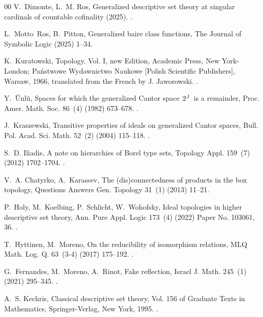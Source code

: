 \documentclass{amsart}
\numberwithin{equation}{section}
\newcommand{\1}{\mathbf{I}}
\newcommand{\2}{\mathbf{II}}
\theoremstyle{definition}
\theoremstyle{remark}
\begin{document}
\begin{thebibliography}{00}
V.~Dimonte, L.~M. Ros, Generalized descriptive set theory at singular cardinals
  of countable cofinality (2025).
\newblock \href {https://doi.org/10.48550/arXiv.2511.16188}
  {}.

L.~Motto~Ros, B.~Pitton, Generalized baire class functions, The Journal of
  Symbolic Logic (2025) 1–34\href {https://doi.org/10.1017/jsl.2025.10163}
  {}.

K.~Kuratowski, Topology. {V}ol. {I}, new Edition, Academic Press, New
  York-London; Pa\'nstwowe Wydawnictwo Naukowe [Polish Scientific Publishers],
  Warsaw, 1966, translated from the French by J. Jaworowski.
\newblock \href {https://doi.org/10.1002/zamm.19670470839}
  {}.

Y.~\"Unlü, Spaces for which the generalized {C}antor space {$2\sp{J}$}\ is a
  remainder, Proc. Amer. Math. Soc. 86~(4) (1982) 673--678.
\newblock \href {https://doi.org/10.2307/2043608} {}.

J.~Kraszewski, Transitive properties of ideals on generalized {C}antor spaces,
  Bull. Pol. Acad. Sci. Math. 52~(2) (2004) 115--118.
\newblock \href {https://doi.org/10.4064/ba52-2-1}
  {}.

S.~D. Iliadis, A note on hierarchies of {B}orel type sets, Topology Appl.
  159~(7) (2012) 1702--1704.
\newblock \href {https://doi.org/10.1016/j.topol.2011.09.041}
  {}.

V.~A. Chatyrko, A.~Karassev, The (dis)connectedness of products in the box
  topology, Questions Answers Gen. Topology 31~(1) (2013) 11--21.

P.~Holy, M.~Koelbing, P.~Schlicht, W.~Wohofsky, Ideal topologies in higher
  descriptive set theory, Ann. Pure Appl. Logic 173~(4) (2022) Paper No.
  103061, 36.
\newblock \href {https://doi.org/10.1016/j.apal.2021.103061}
  {}.

T.~Hyttinen, M.~Moreno, On the reducibility of isomorphism relations, MLQ Math.
  Log. Q. 63~(3-4) (2017) 175--192.
\newblock \href {https://doi.org/10.1002/malq.201500062}
  {}.

G.~Fernandes, M.~Moreno, A.~Rinot, Fake reflection, Israel J. Math. 245~(1)
  (2021) 295--345.
\newblock \href {https://doi.org/10.1007/s11856-021-2213-2}
  {}.

A.~S. Kechris, Classical descriptive set theory, Vol. 156 of Graduate Texts in
  Mathematics, Springer-Verlag, New York, 1995.
\newblock \href {https://doi.org/10.1007/978-1-4612-4190-4}
  {}.


\end{thebibliography}
\end{document}
